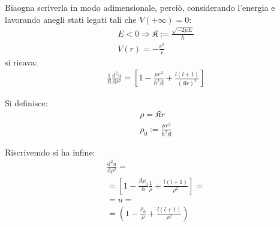 Biaogna scriverla in modo adimensionale, perciò, considerando l'energia e lavorando anegli stati legati tali che $V\left(+\infty \right)=0$:
\begin{equation}\begin{split}
E<0 \Longrightarrow \mathfrak{K}:=\frac{\sqrt{-2\mu E}}{\hbar } \\
V\left(r\right)=-\frac{e^2}{r}
\end{split}\end{equation}
si ricava:
\begin{equation}\begin{split}
\frac{1}{\mathfrak{K}}\frac{\textrm{d}^2u}{\textrm{d}r^2}=\left[1-\frac{\mu e^2}{\hbar ^2\mathfrak{K}}+\frac{l\left(l+1\right)}{\left(\mathfrak{K}r\right)^2}\right]
\end{split}\end{equation}

Si definisce:
\begin{equation}\begin{split}
\rho=\mathfrak{K}r \\
\rho_0:=\frac{\mu e^2}{\hbar ^2\mathfrak{K}}
\end{split}\end{equation}

Riscrivemdo si ha infine:
\begin{equation}\begin{split}
\frac{\textrm{d}^2u}{\textrm{d}\rho^2}=\\
=\left[1-\frac{\mathfrak{K}\rho_0}{\hbar }\frac{1}{\rho}+\frac{l\left(l+1\right)}{\rho^2}\right]=\\
=u=\\
=\left(1-\frac{\rho_0}{\rho}+\frac{l\left(l+1\right)}{\rho^2}\right)
\end{split}\end{equation}


